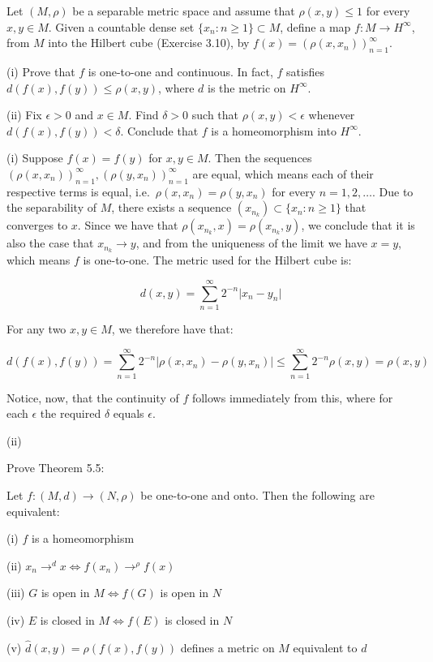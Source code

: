 \begin{exercise}{51}
    Let $(M, \rho)$ be a separable metric space and assume that $\rho(x, y) \leq 1$ for every $x, y \in M$.
    Given a countable dense set $\{x_n: n \geq 1\} \subset M$, define a map $f: M \rightarrow H^{\infty}$, from $M$ into the Hilbert cube (Exercise 3.10), by $f(x) = (\rho(x, x_n))_{n=1}^{\infty}$.

    (i) Prove that $f$ is one-to-one and continuous.
    In fact, $f$ satisfies $d(f(x), f(y)) \leq \rho(x, y)$, where $d$ is the metric on $H^{\infty}$.

    (ii) Fix $\epsilon > 0$ and $x \in M$.
    Find $\delta > 0$ such that $\rho(x, y) < \epsilon$ whenever $d(f(x), f(y)) < \delta$.
    Conclude that $f$ is a homeomorphism into $H^{\infty}$.
\end{exercise}

\begin{solution}
    
    (i) Suppose $f(x) = f(y)$ for $x, y \in M$.
    Then the sequences $(\rho(x, x_n))_{n=1}^{\infty}, (\rho(y, x_n))_{n=1}^{\infty}$ are equal, which means each of their respective terms is equal, i.e.\ $\rho(x, x_n) = \rho(y, x_n)$ for every $n = 1, 2, \ldots$.
    Due to the separability of $M$, there exists a sequence $(x_{n_k}) \subset \{x_n: n \geq 1\}$ that converges to $x$.
    Since we have that $\rho(x_{n_k}, x) = \rho(x_{n_k}, y)$, we conclude that it is also the case that $x_{n_k} \rightarrow y$, and from the uniqueness of the limit we have $x = y$, which means $f$ is one-to-one.
    The metric used for the Hilbert cube is:

    \[d(x, y) = \sum_{n=1}^{\infty}2^{-n} \lvert x_n - y_n \rvert\]

    For any two $x, y \in M$, we therefore have that:

    \[d(f(x), f(y)) = \sum_{n=1}^{\infty} 2^{-n} \lvert \rho(x, x_n) - \rho(y, x_n) \rvert \leq \sum_{n=1}^{\infty} 2^{-n} \rho(x, y) = \rho(x, y)\]

    Notice, now, that the continuity of $f$ follows immediately from this, where for each $\epsilon$ the required $\delta$ equals $\epsilon$.

    (ii)
    
\end{solution}

\begin{exercise}{52}
    Prove Theorem 5.5:

    Let $f: (M, d) \rightarrow (N, \rho)$ be one-to-one and onto.
    Then the following are equivalent:

    (i) $f$ is a homeomorphism

    (ii) $x_n \rightarrow^{d} x \iff f(x_n) \rightarrow^{\rho} f(x)$ 

    (iii) $G$ is open in $M \iff f(G)$  is open in $N$

    (iv) $E$ is closed in $M \iff f(E)$ is closed in $N$

    (v) $\hat{d}(x, y) = \rho(f(x), f(y))$ defines a metric on $M$ equivalent to $d$
\end{exercise}

